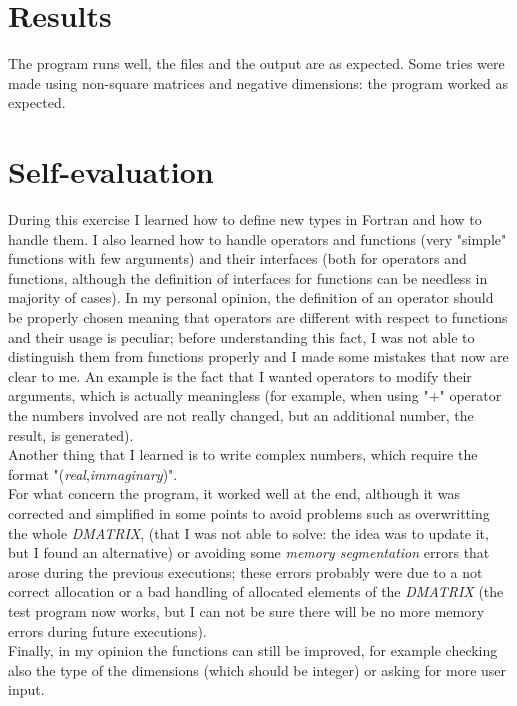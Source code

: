 \documentclass[12pt, a4paper, notitlepage]{report}
\begin{document}
\section*{Results}
The program runs well, the files and the output are as expected.
Some tries were made using non-square matrices and negative dimensions: the program worked as expected.

\section*{Self-evaluation}
During this exercise I learned how to define new types in Fortran and how to handle them. I also learned how to handle operators and functions (very "simple" functions with few arguments) and their interfaces (both for operators and functions, although the definition of interfaces for functions can be needless in majority of cases). In my personal opinion, the definition of an operator should be properly chosen meaning that operators are different with respect to functions and their usage is peculiar; before understanding this fact, I was not able to distinguish them from functions properly and I made some mistakes that now are clear to me. An example is the fact that I wanted operators to modify their arguments, which is actually meaningless (for example, when using "+" operator the numbers involved are not really changed, but an additional number, the result, is generated).\\
Another thing that I learned is to write complex numbers, which require the format "(\textit{real},\textit{immaginary})".\\
For what concern the program, it worked well at the end, although it was corrected and simplified in some points to avoid problems such as overwritting the whole \textit{DMATRIX}, (that I was not able to solve: the idea was to update it, but I found an alternative) or avoiding some \textit{memory segmentation} errors that arose during the previous executions; these errors probably were due to a not correct allocation or a bad handling of allocated elements of the \textit{DMATRIX} (the test program now works, but I can not be sure there will be no more memory errors during future executions).\\
Finally, in my opinion the functions can still be improved, for example checking also the type of the dimensions (which should be integer) or asking for more user input.
\end{document}
